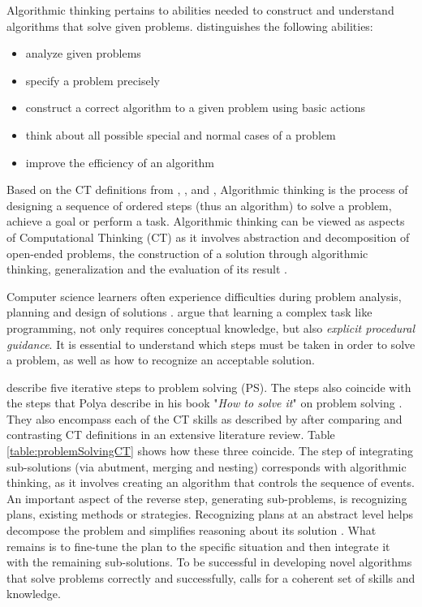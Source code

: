 Algorithmic thinking pertains to abilities needed to construct and understand algorithms that solve given problems.  distinguishes the following abilities:
\begin{itemize}
\item analyze given problems
\item specify a problem precisely
\item construct a correct algorithm to a given problem using basic actions
\item think about all possible special and normal cases of a problem
\item improve the efficiency of an algorithm
\end{itemize}
Based on the CT definitions from \cite{CAS2014CT}, \cite{Google2017CT}, \cite{BrennanResnick2012} and \cite{CSTA2011CT}, Algorithmic thinking is the process of designing a sequence of ordered steps (thus an algorithm) to solve a problem, achieve a goal or perform a task\cite{corradini2017conceptions}. Algorithmic thinking can be viewed as aspects of Computational Thinking (CT) as it involves abstraction and decomposition of open-ended problems, the construction of a solution through algorithmic thinking, generalization and the evaluation of its result \cite{Wing2006}.



Computer science learners often experience difficulties during problem analysis, planning and design of solutions \cite{Hazzan2011}.  argue that learning a complex task like programming, not only requires conceptual knowledge, but also \emph{explicit procedural guidance}. It is essential to understand which steps must be taken in order to solve a problem, as well as how to recognize an acceptable solution.


 describe five iterative steps to problem solving (PS). The steps also coincide with the steps that Polya describe in his book "\emph{How to solve it}" on problem solving \cite{polya2004solve}. They also encompass each of the CT skills as described by  after comparing and contrasting CT definitions in an extensive literature review.  Table \ref{table:problemSolvingCT} shows how these three coincide. The step of integrating sub-solutions (via abutment, merging and nesting) corresponds with algorithmic thinking, as it involves creating an algorithm that controls the sequence of events. An important aspect of the reverse step, generating sub-problems, is recognizing plans, existing methods or strategies. Recognizing plans at an abstract level helps decompose the problem and simplifies reasoning about its solution \cite{Smetsers2017}. What remains is to fine-tune the plan to the specific situation and then integrate it with the remaining sub-solutions. To be successful in developing novel algorithms that solve problems correctly and successfully, calls for a coherent set of skills and knowledge.



